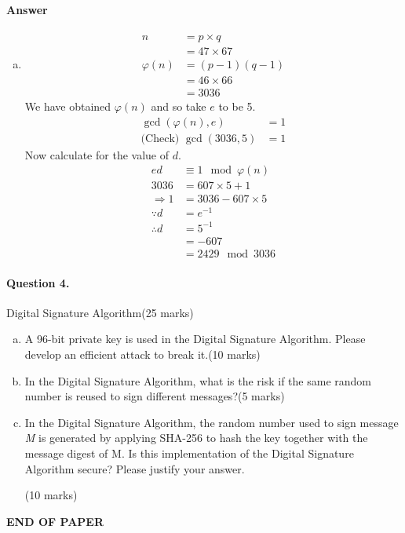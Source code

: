 \documentclass[12pt]{article}
\begin{document}
\paragraph{Answer}
\begin{enumerate}[(a)]
\item \begin{equation*}
\begin{split}
n&=p\times q\\
&=47\times 67\\
\varphi(n)&=(p-1)(q-1)\\
&=46\times 66\\
&=3036
\end{split}
\end{equation*}
We have obtained $\varphi(n)$ and so take $e$ to be 5.
\begin{equation*}
\begin{split}
\gcd(\varphi(n),e)&=1\\
\text{(Check) }\gcd(3036,5)&=1
\end{split}
\end{equation*}
Now calculate for the value of $d$.
\begin{equation*}
\begin{split}
ed&\equiv 1\mod \varphi(n)\\
3036&=607\times 5+1\\
\Rightarrow 1&=3036-607\times 5\\
\because d&=e^{-1}\\\therefore d&=5^{-1}\\&=-607\\&=2429\mod 3036
\end{split}
\end{equation*}
\end{enumerate}
\newpage
\paragraph{Question 4.}   Digital Signature Algorithm\hfill (25 marks)
\begin{enumerate}[(a)]
    \item A 96-bit private key is used in the Digital Signature Algorithm. Please develop an efficient attack to break it.\hfill (10 marks)
    \item In the Digital Signature Algorithm, what is the risk if the same random number is reused to sign different messages?\hfill (5 marks)
    \item In the Digital Signature Algorithm, the random number used to sign message \textit{M} is generated by applying SHA-256 to hash the key together with the message digest of M. Is this implementation of the Digital Signature Algorithm secure? Please justify your answer.{\vspace{-2.5em}\begin{flushright} (10 marks)\end{flushright}}
\end{enumerate}
\bigskip
\vfill
\begin{center}{\bf END OF PAPER}\end{center}
\end{document}
